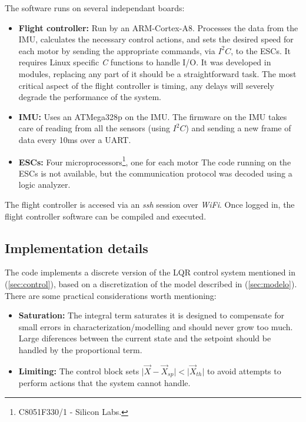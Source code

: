 \documentclass[conference]{IEEEtran}
\newcommand{\refp}[1]{(\ref{#1})}
\begin{document}
The software runs on several independant boards:

\begin{itemize}
\item \textbf{Flight controller:} Run by an ARM-Cortex-A8. Processes the data from the IMU, calculates the necessary control actions, and sets the desired speed for each motor by sending the appropriate commands, via $I^2C$, to the ESCs. It requires Linux specific \textit{C} functions to handle I/O. It was developed in modules, replacing any part of it should be a straightforward task. The most critical aspect of the flight controller is timing, any delays will severely degrade the performance of the system.
\item \textbf{IMU:} Uses an ATMega328p on the IMU. The firmware on the IMU takes care of reading from all the sensors (using $I^2C$) and sending a new frame of data every 10ms over a UART.
\item \textbf{ESCs:} Four microprocessors\footnote{C8051F330/1 - Silicon Labs.}, one for each motor The code running on the ESCs is not available, but the communication protocol was decoded using a logic analyzer.
\end{itemize}

The flight controller is accesed via an \textit{ssh} session over \textit{WiFi}. Once logged in, the flight controller software can be compiled and executed.

\subsection{Implementation details}
\label{sec:software-impl}

The code implements a discrete version of the LQR control system mentioned in \refp{sec:control}, based on a discretization of the model described in \refp{sec:modelo}. There are some practical considerations worth mentioning:
\begin{itemize}
\item \textbf{Saturation:} The integral term saturates it is designed to compensate for small errors in characterization/modelling and should never grow too much. Large diferences between the current state and the setpoint should be handled by the proportional term.
\item \textbf{Limiting:} The control block sets $\vert \vec{X} - \vec{X}_{sp}\vert < \vert \vec{X}_{th} \vert$ to avoid attempts to perform actions that the system cannot handle.
\end{itemize}
\end{document}
